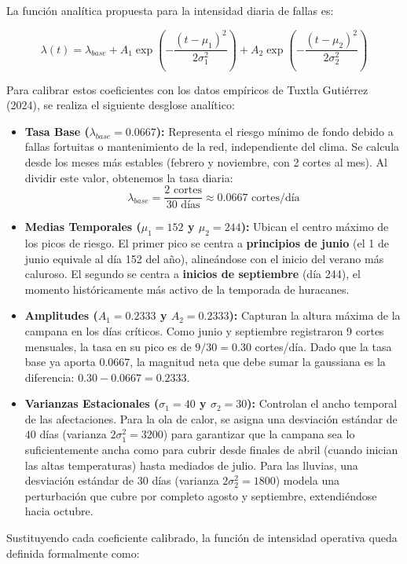 \documentclass[
  spanish,
  letterpaper,
  DIV=11,
  numbers=noendperiod]{scrreprt}
\theoremstyle{plain}
\theoremstyle{definition}
\theoremstyle{remark}
\begin{document}
La función analítica propuesta para la intensidad diaria de fallas es:

\[\lambda(t) = \lambda_{base} + A_1 \exp\left(-\frac{(t - \mu_1)^2}{2\sigma_1^2}\right) + A_2 \exp\left(-\frac{(t - \mu_2)^2}{2\sigma_2^2}\right)\]

Para calibrar estos coeficientes con los datos empíricos de Tuxtla
Gutiérrez (2024), se realiza el siguiente desglose analítico:

\begin{itemize}
\item
  \textbf{Tasa Base (\(\lambda_{base} = 0.0667\)):} Representa el riesgo
  mínimo de fondo debido a fallas fortuitas o mantenimiento de la red,
  independiente del clima. Se calcula desde los meses más estables
  (febrero y noviembre, con 2 cortes al mes). Al dividir este valor,
  obtenemos la tasa diaria:
  \[\lambda_{base} = \frac{2 \text{ cortes}}{30 \text{ días}} \approx 0.0667 \text{ cortes/día}\]
\item
  \textbf{Medias Temporales (\(\mu_1 = 152\) y \(\mu_2 = 244\)):} Ubican
  el centro máximo de los picos de riesgo. El primer pico se centra a
  \textbf{principios de junio} (el 1 de junio equivale al día 152 del
  año), alineándose con el inicio del verano más caluroso. El segundo se
  centra a \textbf{inicios de septiembre} (día 244), el momento
  históricamente más activo de la temporada de huracanes.
\item
  \textbf{Amplitudes (\(A_1 = 0.2333\) y \(A_2 = 0.2333\)):} Capturan la
  altura máxima de la campana en los días críticos. Como junio y
  septiembre registraron 9 cortes mensuales, la tasa en su pico es de
  \(9/30 = 0.30\) cortes/día. Dado que la tasa base ya aporta
  \(0.0667\), la magnitud neta que debe sumar la gaussiana es la
  diferencia: \(0.30 - 0.0667 = 0.2333\).
\item
  \textbf{Varianzas Estacionales (\(\sigma_1 = 40\) y
  \(\sigma_2 = 30\)):} Controlan el ancho temporal de las afectaciones.
  Para la ola de calor, se asigna una desviación estándar de \(40\) días
  (varianza \(2\sigma_1^2 = 3200\)) para garantizar que la campana sea
  lo suficientemente ancha como para cubrir desde finales de abril
  (cuando inician las altas temperaturas) hasta mediados de julio. Para
  las lluvias, una desviación estándar de \(30\) días (varianza
  \(2\sigma_2^2 = 1800\)) modela una perturbación que cubre por completo
  agosto y septiembre, extendiéndose hacia octubre.
\end{itemize}

Sustituyendo cada coeficiente calibrado, la función de intensidad
operativa queda definida formalmente como:
\end{document}
